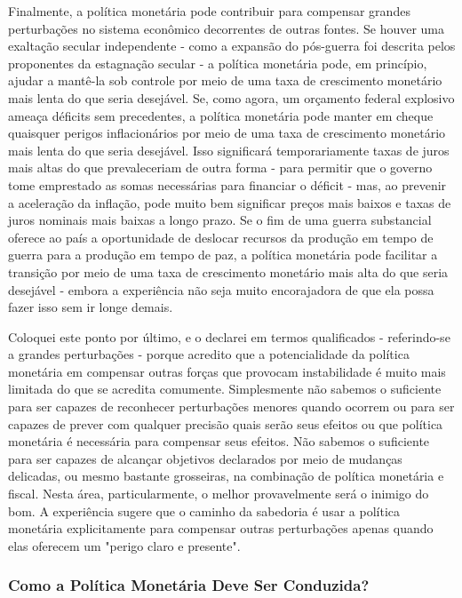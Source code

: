 \documentclass[a4paper,12pt]{article}[abntex2]
\begin{document}
Finalmente, a política monetária pode contribuir para compensar grandes perturbações no sistema econômico decorrentes de outras fontes. Se houver uma exaltação secular independente - como a expansão do pós-guerra foi descrita pelos proponentes da estagnação secular - a política monetária pode, em princípio, ajudar a mantê-la sob controle por meio de uma taxa de crescimento monetário mais lenta do que seria desejável. Se, como agora, um orçamento federal explosivo ameaça déficits sem precedentes, a política monetária pode manter em cheque quaisquer perigos inflacionários por meio de uma taxa de crescimento monetário mais lenta do que seria desejável. Isso significará temporariamente taxas de juros mais altas do que prevaleceriam de outra forma - para permitir que o governo tome emprestado as somas necessárias para financiar o déficit - mas, ao prevenir a aceleração da inflação, pode muito bem significar preços mais baixos e taxas de juros nominais mais baixas a longo prazo. Se o fim de uma guerra substancial oferece ao país a oportunidade de deslocar recursos da produção em tempo de guerra para a produção em tempo de paz, a política monetária pode facilitar a transição por meio de uma taxa de crescimento monetário mais alta do que seria desejável - embora a experiência não seja muito encorajadora de que ela possa fazer isso sem ir longe demais.

Coloquei este ponto por último, e o declarei em termos qualificados - referindo-se a grandes perturbações - porque acredito que a potencialidade da política monetária em compensar outras forças que provocam instabilidade é muito mais limitada do que se acredita comumente. Simplesmente não sabemos o suficiente para ser capazes de reconhecer perturbações menores quando ocorrem ou para ser capazes de prever com qualquer precisão quais serão seus efeitos ou que política monetária é necessária para compensar seus efeitos. Não sabemos o suficiente para ser capazes de alcançar objetivos declarados por meio de mudanças delicadas, ou mesmo bastante grosseiras, na combinação de política monetária e fiscal. Nesta área, particularmente, o melhor provavelmente será o inimigo do bom. A experiência sugere que o caminho da sabedoria é usar a política monetária explicitamente para compensar outras perturbações apenas quando elas oferecem um "perigo claro e presente".

\subsubsection{\textbf{Como a Política Monetária Deve Ser Conduzida?}}
\end{document}
